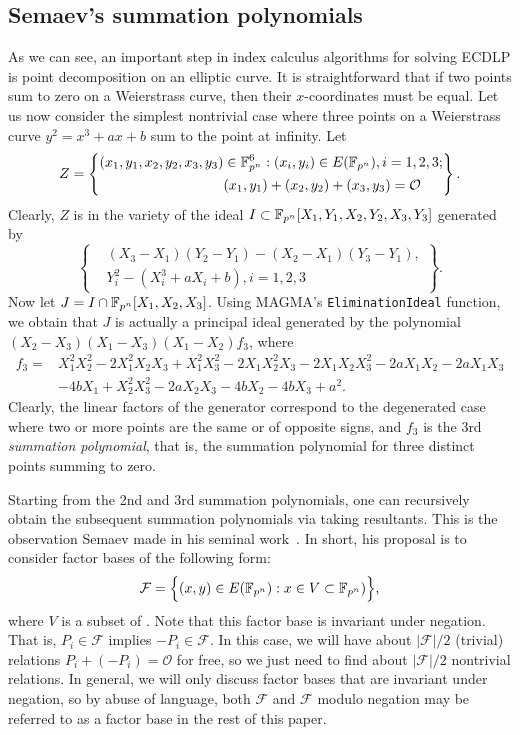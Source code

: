 \subsection{Semaev's summation polynomials}
%
\label{sec:summation-polynomials}
%
As we can see, an important step in index calculus algorithms for
solving ECDLP is point decomposition on an elliptic curve.
%
It is straightforward that if two points sum to zero on a Weierstrass
curve, then their $x$-coordinates must be equal.
%
Let us now consider the simplest nontrivial case where three points on
a Weierstrass curve $y^2=x^3+ax+b$ sum to the point at infinity.
%
Let
\[ Z=\left\{\begin{aligned}
      (x_1,y_1,x_2,y_2,x_3,y_3)&\in\mathbb F_{p^n}^6:(x_i,y_i)\in E(\mathbb F_{p^n}),i=1,2,3; \\
      & (x_1,y_1)+(x_2,y_2)+(x_3,y_3)=\mathcal O
    \end{aligned} \right\}. \]
%
Clearly, $Z$ is in the variety of the ideal
$I\subset\mathbb F_{p^n}[X_1,Y_1,X_2,Y_2,X_3,Y_3]$ generated by
\[ \left\{\begin{aligned}
      &  (X_3 - X_1)(Y_2 - Y_1) - (X_2 - X_1)(Y_3 - Y_1),\\
      & Y_i^2 - (X_i^3 + aX_i + b),i=1,2,3
    \end{aligned}\right\}. \]
%
Now let $J=I\cap\mathbb F_{p^n}[X_1,X_2,X_3]$.
%
Using MAGMA's \texttt{EliminationIdeal} function, we obtain that $J$
is actually a principal ideal generated by the polynomial
$(X_2 - X_3)(X_1 - X_3)(X_1 - X_2)f_3$, where
%
\begin{align*}
  f_3 = & X_1^2X_2^2 - 2X_1^2X_2X_3 + X_1^2X_3^2 - 2X_1X_2^2X_3 - 2X_1X_2X_3^2 - 2aX_1X_2 - 2aX_1X_3 \\
        & - 4bX_1 + X_2^2X_3^2 - 2aX_2X_3 - 4bX_2 - 4bX_3 + a^2.
\end{align*}
%
Clearly, the linear factors of the generator correspond to the
degenerated case where two or more points are the same or of opposite
signs, and $f_3$ is the 3rd \emph{summation polynomial}, that is, the
summation polynomial for three distinct points summing to zero.

Starting from the 2nd and 3rd summation polynomials, one can
recursively obtain the subsequent summation polynomials via taking
resultants.
%
This is the observation Semaev made in his seminal
work~\cite{DBLP:journals/iacr/Semaev04}.
%
In short, his proposal is to consider factor bases of the following
form:
\[ \mathcal F=\Big\{(x,y)\in E(\mathbb F_{p^n}):x\in
  V\subset\mathbb F_{p^n})\Big\}, \] where $V$ is a subset of .
%
Note that this factor base is invariant under negation.
%
That is, $P_i\in\mathcal F$ implies $-P_i\in\mathcal F$.
%
In this case, we will have about $|\mathcal F|/2$ (trivial) relations
$P_i+(-P_i)=\mathcal O$ for free, so we just need to find about
$|\mathcal F|/2$ nontrivial relations.
%
In general, we will only discuss factor bases that are invariant under
negation, so by abuse of language, both $\mathcal F$ and $\mathcal F$
modulo negation may be referred to as a factor base in the rest of
this paper.

